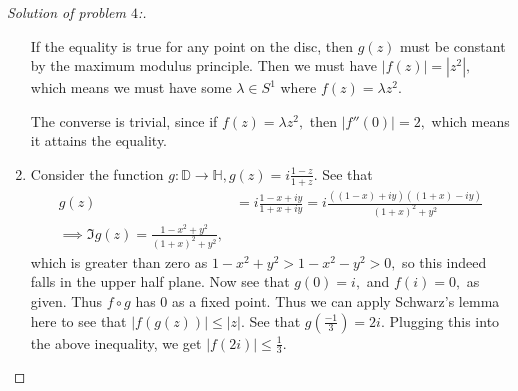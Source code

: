 \documentclass[letterpaper,11pt,twoside]{article}
\theoremstyle{proposition}
\theoremstyle{definition}
\theoremstyle{theorem}
\theoremstyle{definition}
\theoremstyle{definition}
\theoremstyle{definition}
\theoremstyle{lemma}
\theoremstyle{definition}
\theoremstyle{definition}
\theoremstyle{corollary}
\theoremstyle{definition}
\theoremstyle{definition}
\theoremstyle{definition}
\newcommand{\abs}[1]{\left \vert #1 \right \vert}
\begin{document}
\begin{proof}[Solution of problem $4$:]
\begin{enumerate}
	If the equality is true for any point on the disc, then $g(z)$ must be constant by the maximum modulus principle. Then we must have $\abs{f(z)}= 
	\abs{z^2},$ which means we must have some $\lambda \in S^1$ where $f(z)=\lambda z^2.$ 
	
	The converse is trivial, since if $f(z)=\lambda z^2,$ then $|f''(0)| = 2,$ which means it attains the equality.
	\item Consider the function $ g:\mathbb{D} \to \mathbb{H}, g(z)= i\frac{1-z}{1+z}.$ See that 
	\begin{align*}
		g(z) &= i\frac{1-x + iy}{1+x + iy} = i \frac{((1-x)+iy)((1+x)-iy)}{(1+x)^2+ y^2}\\
		\implies \Im{g(z)}= \frac{1-x^2 + y^2}{(1+x)^2+ y^2},
	\end{align*}
		which is greater than zero as $ 1-x^2 + y^2 > 1- x^2 -y^2 > 0,$ so this indeed falls in the upper half plane. Now see that $g(0)=i,$ and $f(i)=0,$ 
		as given. Thus $f\circ g$ has $0$ as a fixed point. Thus we can apply Schwarz's lemma here to see that $\abs{f(g(z))} \leq \abs{z}.$ See that 
		$g\left(\frac{-1}{3}\right)= 2i.$ Plugging this into the above inequality, we get $\abs{f(2i)} \leq \frac{1}{3}.$ 
 	\end{enumerate}
	\end{proof}
\end{document}
